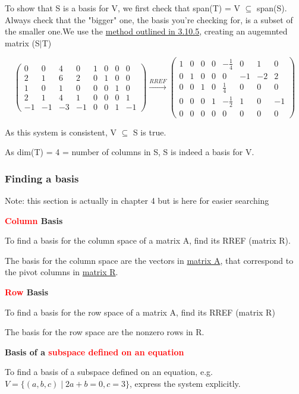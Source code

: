 \documentclass{article}
\newcommand{\sub}[1]{\vspace{10pt}\textbf{#1}}
\begin{document}
To show that S is a basis for V, we first check that span(T) = V $\subseteq$ span(S). Always check that the "bigger" one, the basis you're checking for, is a subset of the smaller one.We use the \hyperref[sec:sossr]{method outlined in 3.10.5}, creating an augemnted matrix (S$|$T)

\[
\begin{pmatrix}
0 & 0 & 4 & 0 & 1 & 0 & 0 & 0 \\
2 & 1 & 6 & 2 & 0 & 1 & 0 & 0 \\
1 & 0 & 1 & 0 & 0 & 0 & 1 & 0 \\
2 & 1 & 4 & 1 & 0 & 0 & 0 & 1 \\
-1 & -1 & -3 & -1 & 0 & 0 & 1 & -1
\end{pmatrix}
\xrightarrow{RREF}
\begin{pmatrix}
1 & 0 & 0 & 0 & -\frac{1}{4} & 0 & 1 & 0 \\
0 & 1 & 0 & 0 & 0 & -1 & -2 & 2 \\
0 & 0 & 1 & 0 & \frac{1}{4} & 0 & 0 & 0 \\
0 & 0 & 0 & 1 & -\frac{1}{2} & 1 & 0 & -1 \\
0 & 0 & 0 & 0 & 0 & 0 & 0 & 0
\end{pmatrix}
\]

As this system is consistent, V $\subseteq$ S is true.

As dim(T) = 4 = number of columns in S, S is indeed a basis for V.

\subsubsection{Finding a basis}
Note: this section is actually in chapter 4 but is here for easier searching

\sub{\textcolor{red}{Column} Basis}

To find a basis for the column space of a matrix A, find its RREF (matrix R).

The basis for the column space are the vectors in \underline{matrix A}, that correspond to the pivot columns in \underline{matrix R}.

\sub{\textcolor{red}{Row} Basis}

To find a basis for the row space of a matrix A, find its RREF (matrix R)

The basis for the row space are the nonzero rows in R.

\sub{Basis of a \textcolor{red}{subspace defined on an equation}}

To find a basis of a subspace defined on an equation, e.g. $V = \{(a,b,c) \mid 2a+b=0, c= 3\}$, express the system explicitly.
\end{document}
